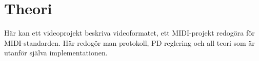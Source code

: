 \documentclass[\docdir/tech.tex]{subfiles}
\begin{document}
\section{Theori}
Här kan ett videoprojekt beskriva videoformatet, ett MIDI-projekt redogöra för
MIDI-standarden. Här redogör man protokoll, PD reglering och all teori som är
utanför själva implementationen.
\end{document}
